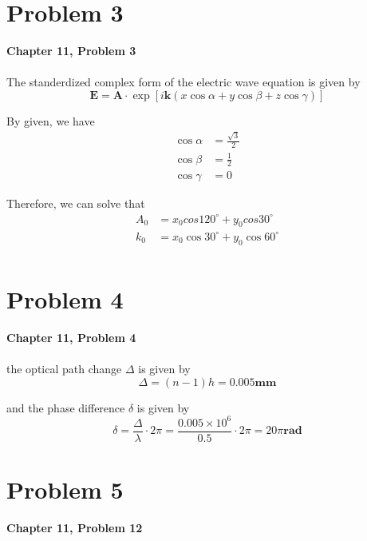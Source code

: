 \documentclass{article}
\begin{document}
\section{Problem 3}
\textbf{Chapter 11, Problem 3}\\\\

The standerdized complex form of the electric wave equation is given by
\begin{equation}
    \mathbf{E} = \mathbf{A}\cdot \exp{\left[i\mathbf{k}(x\cos{\alpha}+y\cos{\beta}+z\cos{\gamma})\right]}
\end{equation}

By given, we have
\begin{align}
    \cos{\alpha} & = \frac{\sqrt{3}}{2} \\
    \cos{\beta}  & = \frac{1}{2}        \\
    \cos{\gamma} & = 0
\end{align}

Therefore, we can solve that
\begin{align*}
    A_0 & = x_0cos{120 ^\circ}+y_0cos{30 ^\circ} \\
    k_0 & =x_0\cos{30 ^\circ}+y_0\cos{60 ^\circ} \\
\end{align*}

\section{Problem 4}
\textbf{Chapter 11, Problem 4}\\\\

the optical path change $\Delta$ is given by
\begin{equation*}
    \Delta = (n-1)h = 0.005 \textbf{mm}
\end{equation*}

and the phase difference $\delta$ is given by
\begin{equation*}
    \delta = \frac{\Delta}{\lambda}\cdot 2\pi = \frac{0.005\times 10^6}{0.5}\cdot 2\pi = 20\pi \textbf{rad}
\end{equation*}

\section{Problem 5}
\textbf{Chapter 11, Problem 12}\\\\
\end{document}
